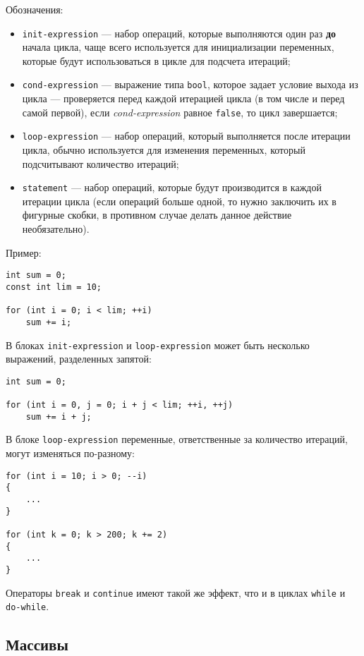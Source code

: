 Обозначения:
\begin{itemize}
    \item \lstinline|init-expression| --- набор операций, которые выполняются один раз \textbf{до} начала цикла, чаще всего используется для инициализации переменных, которые будут использоваться в цикле для подсчета итераций;
    \item \lstinline|cond-expression| --- выражение типа \lstinline|bool|, которое задает условие выхода из цикла --- проверяется перед каждой итерацией цикла (в том числе и перед самой первой), если \textit{cond-expression} равное \lstinline|false|, то цикл завершается;
    \item \lstinline|loop-expression| --- набор операций, который выполняется после итерации цикла, обычно используется для изменения переменных, который подсчитывают количество итераций;
    \item \lstinline|statement| --- набор операций, которые будут производится в каждой итерации цикла (если операций больше одной, то нужно заключить их в фигурные скобки, в противном случае делать данное действие необязательно).
\end{itemize}

Пример:

\begin{lstlisting}
int sum = 0;
const int lim = 10;

for (int i = 0; i < lim; ++i)
    sum += i;
\end{lstlisting}

В блоках \lstinline|init-expression| и \lstinline|loop-expression| может быть несколько выражений, разделенных запятой:
\begin{lstlisting}
int sum = 0;

for (int i = 0, j = 0; i + j < lim; ++i, ++j)
    sum += i + j;
\end{lstlisting}

В блоке \lstinline|loop-expression| переменные, ответственные за количество
итераций, могут изменяться по-разному:
\begin{lstlisting}
for (int i = 10; i > 0; --i)
{
    ...
}

for (int k = 0; k > 200; k += 2)
{
    ...
}
\end{lstlisting}

Операторы \lstinline|break| и \lstinline|continue| имеют такой же эффект, что и в циклах \lstinline|while| и \lstinline|do-while|.

\subsection{Массивы}
\label{subsec:Arrays}
